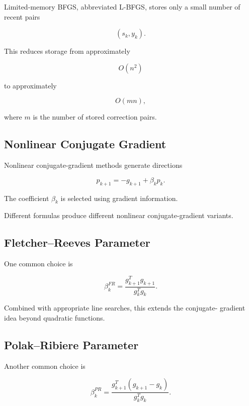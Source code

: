 Limited-memory BFGS, abbreviated L-BFGS, stores only a small number of
recent pairs

\[
\boxed{
(s_k,y_k).
}
\]

This reduces storage from approximately

\[
O(n^2)
\]

to approximately

\[
\boxed{
O(mn),
}
\]

where \(m\) is the number of stored correction pairs.

\subsection{Nonlinear Conjugate Gradient}
\label{subsec:nonlinear-conjugate-gradient}

Nonlinear conjugate-gradient methods generate directions

\[
\boxed{
p_{k+1}
=
-g_{k+1}
+
\beta_kp_k.
}
\]

The coefficient \(\beta_k\) is selected using gradient information.

Different formulas produce different nonlinear conjugate-gradient
variants.

\subsection{Fletcher--Reeves Parameter}
\label{subsec:fletcher-reeves}

One common choice is

\[
\boxed{
\beta_k^{FR}
=
\frac{
g_{k+1}^Tg_{k+1}
}{
g_k^Tg_k
}.
}
\]

Combined with appropriate line searches, this extends the conjugate-
gradient idea beyond quadratic functions.

\subsection{Polak--Ribiere Parameter}
\label{subsec:polak-ribiere}

Another common choice is

\[
\boxed{
\beta_k^{PR}
=
\frac{
g_{k+1}^T
(
g_{k+1}-g_k
)
}{
g_k^Tg_k
}.
}
\]

